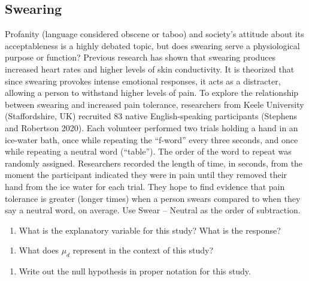 \documentclass[
]{report}
\providecommand{\tightlist}{%
  \setlength{\itemsep}{0pt}\setlength{\parskip}{0pt}}
\begin{document}
\subsection{Swearing}\label{swearing}

Profanity (language considered obscene or taboo) and society's attitude about its acceptableness is a highly debated topic, but does swearing serve a physiological purpose or function? Previous research has shown that swearing produces increased heart rates and higher levels of skin conductivity. It is theorized that since swearing provokes intense emotional responses, it acts as a distracter, allowing a person to withstand higher levels of pain. To explore the relationship between swearing and increased pain tolerance, researchers from Keele University (Staffordshire, UK) recruited 83 native English-speaking participants (Stephens and Robertson 2020). Each volunteer performed two trials holding a hand in an ice-water bath, once while repeating the ``f-word'' every three seconds, and once while repeating a neutral word (``table''). The order of the word to repeat was randomly assigned. Researchers recorded the length of time, in seconds, from the moment the participant indicated they were in pain until they removed their hand from the ice water for each trial. They hope to find evidence that pain tolerance is greater (longer times) when a person swears compared to when they say a neutral word, on average. Use Swear -- Neutral as the order of subtraction.

\begin{enumerate}
\def\labelenumi{\arabic{enumi}.}
\tightlist
\item
  What is the explanatory variable for this study? What is the response?
\end{enumerate}

\vspace{0.5in}

\begin{enumerate}
\def\labelenumi{\arabic{enumi}.}
\setcounter{enumi}{1}
\tightlist
\item
  What does \(\mu_d\) represent in the context of this study?
\end{enumerate}

\vspace{0.8in}

\begin{enumerate}
\def\labelenumi{\arabic{enumi}.}
\setcounter{enumi}{2}
\tightlist
\item
  Write out the null hypothesis in proper notation for this study.
\end{enumerate}
\end{document}
